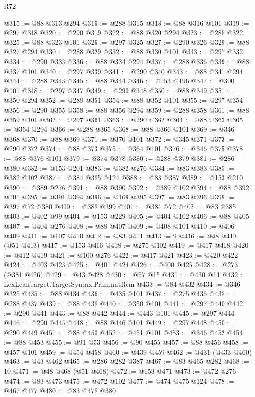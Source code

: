 \begin{lexlean}{R72}
\begin{coremodule}
@315 := @88 @313 @294
@316 := @288 @315
@318 := @88 @316 @101
@319 := @297 @318
@320 := @290 @319
@322 := @88 @320 @294
@323 := @288 @322
@325 := @88 @323 @101
@326 := @297 @325
@327 := @290 @326
@329 := @88 @327 @294
@330 := @288 @329
@332 := @88 @330 @101
@333 := @297 @332
@334 := @290 @333
@336 := @88 @334 @294
@337 := @288 @336
@339 := @88 @337 @101
@340 := @297 @339
@341 := @290 @340
@343 := @88 @341 @294
@344 := @288 @343
@345 := @88 @344
@346 := @153 @196
@347 := @300 @101
@348 := @297 @347
@349 := @290 @348
@350 := @88 @349
@351 := @350 @294
@352 := @288 @351
@354 := @88 @352 @101
@355 := @297 @354
@356 := @290 @355
@358 := @88 @356 @294
@359 := @288 @358
@361 := @88 @359 @101
@362 := @297 @361
@363 := @290 @362
@364 := @88 @363
@365 := @364 @294
@366 := @288 @365
@368 := @88 @366 @101
@369 := @346 @368
@370 := @88 @369
@371 := @370 @101
@372 := @345 @371
@373 := @290 @372
@374 := @88 @373
@375 := @364 @101
@376 := @346 @375
@378 := @88 @376 @101
@379 := @374 @378
@380 := @288 @379
@381 := @286 @380
@382 := @153 @201
@383 := @382 @276
@384 := @83 @383
@385 := @382 @102
@387 := @384 @385 @124
@388 := @83 @387
@389 := @153 @210
@390 := @389 @276
@391 := @88 @390
@392 := @389 @102
@394 := @88 @392 @101
@395 := @391 @394
@396 := @169 @395
@397 := @83 @396
@399 := @397 @72 @380
@400 := @388 @399
@401 := @384 @72
@402 := @83 @385
@403 := @402 @99
@404 := @153 @229
@405 := @404 @102
@406 := @88 @405
@407 := @404 @276
@408 := @88 @407
@409 := @408 @101
@410 := @406 @409
@411 := @107 @410
@412 := @83 @411
@413 := 9
@416 := @48 @413 (@51 @413)
@417 := @153 @416
@418 := @275 @102
@419 := @417 @418
@420 := @412 @419
@421 := @100 @276
@422 := @417 @421
@423 := @420 @422
@424 := @403 @423
@425 := @401 @424
@426 := @400 @425
@428 := @273 (@381 @426)
@429 := @43 @428
@430 := @57 @15
@431 := @430 @11
@432 := LexLeanTarget.TargetSyntax.Prim.natRem
@433 := @84 @432
@434 := @346 @325
@435 := @88 @434
@436 := @435 @101
@437 := @275 @436
@438 := @288 @437
@439 := @88 @438
@440 := @350 @101
@441 := @297 @440
@442 := @290 @441
@443 := @88 @442
@444 := @443 @101
@445 := @297 @444
@446 := @290 @445
@448 := @88 @446 @101
@449 := @297 @448
@450 := @290 @449
@451 := @88 @450
@452 := @451 @101
@453 := @346 @452
@454 := @88 @453
@455 := @91 @53
@456 := @90 @455
@457 := @88 @456
@458 := @457 @101
@459 := @454 @458
@460 := @439 @459
@462 := @431 (@433 @460)
@463 := @43 @462
@465 := @286 @282 @387
@467 := @83 @465 @282
@468 := 10
@471 := @48 @468 (@51 @468)
@472 := @153 @471
@473 := @472 @276
@474 := @83 @473
@475 := @472 @102
@477 := @474 @475 @124
@478 := @467 @477
@480 := @83 @478 @380

\end{coremodule}
\end{lexlean}
